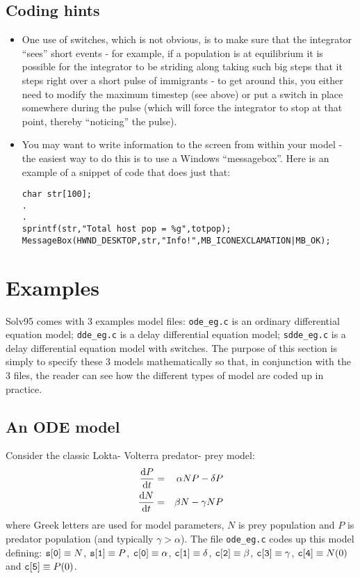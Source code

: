 \documentclass[10pt] {article}
\newcommand{\dif}[2]{\frac{{\rm d} #1}{{\rm d} #2}}
\begin{document}
\subsection{Coding hints}
\begin{itemize}
\item One  use of switches, which is not obvious, is to make sure that the integrator ``sees'' %
short events - for example, if a population is at equilibrium it is possible for the integrator %
to be striding along taking such big steps that it steps right over a short pulse of immigrants - %
to get around this, you either need to modify the maximum timestep (see above) or put a switch in %
place somewhere during the pulse (which will force the integrator to stop at that point, thereby %
``noticing'' the pulse).  
\item You may want to write information to the screen from within your model - the easiest way to %
do this is to use a Windows ``messagebox''. Here is an example of a snippet of code that does %
just that:
\begin{verbatim}
char str[100];
.
.
sprintf(str,"Total host pop = %g",totpop);
MessageBox(HWND_DESKTOP,str,"Info!",MB_ICONEXCLAMATION|MB_OK);
\end{verbatim}
\end{itemize}
\section{Examples}
Solv95 comes with 3 examples model files: {\tt ode\_eg.c} is an ordinary differential equation %
model; {\tt dde\_eg.c} is a delay differential equation model; {\tt sdde\_eg.c} is a delay %
differential equation model with switches. The purpose of this section is simply to specify these %
3 models mathematically so that, in conjunction with the 3 files, the reader can see how the %
different types of model are coded up in practice.
\subsection{An ODE model}
Consider the classic Lokta- Volterra predator- prey model:
\begin{eqnarray*}
\dif{P}{t} & = & \alpha N P - \delta P \\
\dif{N}{t} & = & \beta N - \gamma N P 
\end{eqnarray*} 
where Greek letters are used for model parameters, $ N $ is prey population and $ P $ is predator %
population (and typically $ \gamma > \alpha$). The file {\tt ode\_eg.c} codes up this model %
defining: ${\tt s[0]}\equiv N$, ${\tt s[1]}\equiv P$, ${\tt c[0]}\equiv \alpha$, ${\tt %
c[1]}\equiv  \delta$, ${\tt c[2]}\equiv  \beta$, ${\tt c[3]}\equiv  \gamma$, ${\tt c[4]}\equiv %
N(0)$ and ${\tt c[5]}\equiv P(0)$.
\end{document}
